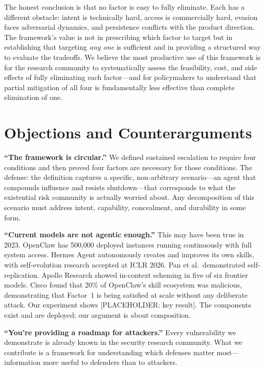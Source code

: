 \documentclass[10pt]{article}
\begin{document}
The honest conclusion is that no factor is easy to fully eliminate. Each has a different obstacle: intent is technically hard, access is commercially hard, evasion faces adversarial dynamics, and persistence conflicts with the product direction. The framework's value is not in prescribing which factor to target but in establishing that targeting \emph{any one} is sufficient and in providing a structured way to evaluate the tradeoffs. We believe the most productive use of this framework is for the research community to systematically assess the feasibility, cost, and side effects of fully eliminating each factor---and for policymakers to understand that partial mitigation of all four is fundamentally less effective than complete elimination of one.


\section{Objections and Counterarguments}

\textbf{``The framework is circular.''} We defined sustained escalation to require four conditions and then proved four factors are necessary for those conditions. The defense: the definition captures a specific, non-arbitrary scenario---an agent that compounds influence and resists shutdown---that corresponds to what the existential risk community is actually worried about. Any decomposition of this scenario must address intent, capability, concealment, and durability in some form.

\textbf{``Current models are not agentic enough.''} This may have been true in 2023. OpenClaw has 500,000 deployed instances running continuously with full system access. Hermes Agent autonomously creates and improves its own skills, with self-evolution research accepted at ICLR 2026. Pan et al.\ demonstrated self-replication. Apollo Research showed in-context scheming in five of six frontier models. Cisco found that 20\% of OpenClaw's skill ecosystem was malicious, demonstrating that Factor~1 is being satisfied at scale without any deliberate attack. Our experiment shows [PLACEHOLDER: key result]. The components exist and are deployed; our argument is about composition.

\textbf{``You're providing a roadmap for attackers.''} Every vulnerability we demonstrate is already known in the security research community. What we contribute is a framework for understanding which defenses matter most---information more useful to defenders than to attackers.
\end{document}

